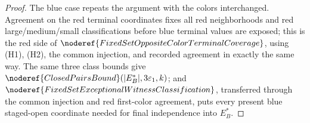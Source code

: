 \begin{proof}
The blue case repeats the argument with the colors interchanged.  Agreement
on the red terminal coordinates fixes all red neighborhoods and red
large/medium/small classifications before blue terminal values are exposed;
this is the red side of
\(\noderef{FixedSetOppositeColorTerminalCoverage}\), using (H1), (H2), the
common injection, and recorded agreement in exactly the same way.  The same
three class bounds give
\(\noderef{ClosedPairsBound}(|E_B^\ast|,3\varepsilon_1,k)\); and
\(\noderef{FixedSetExceptionalWitnessClassification}\), transferred through
the common injection and red first-color agreement, puts every present blue
staged-open coordinate needed for final independence into \(E_B^\ast\).
\end{proof}
